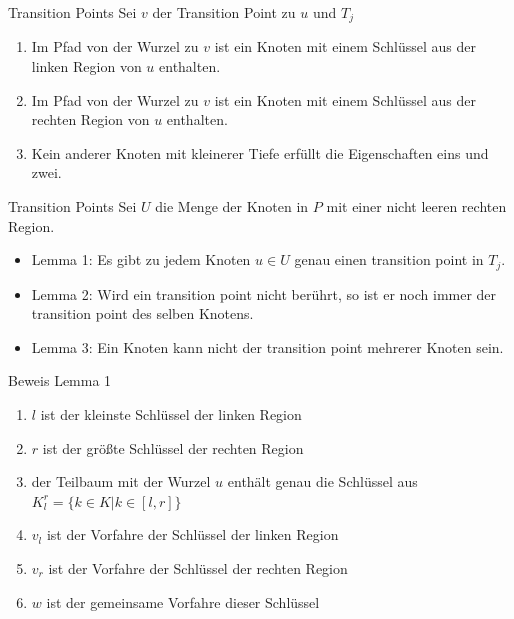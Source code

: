 \documentclass[11pt]{beamer}
\begin{document}
\begin{frame} {Transition Points} 
	Sei $v$ der Transition Point zu $u$ und $T_j$
	\begin{enumerate}
		\item Im Pfad von der Wurzel zu $v$ ist ein Knoten mit einem Schlüssel aus der linken Region von $u$ enthalten.
		\item Im Pfad von der Wurzel zu $v$ ist ein Knoten mit einem Schlüssel aus der rechten Region von $u$ enthalten.
		\item Kein anderer Knoten mit kleinerer Tiefe erfüllt die Eigenschaften eins und zwei. 
	\end{enumerate}	
\end{frame}
\begin{frame} {Transition Points} 
	Sei $U$ die Menge der Knoten in $P$ mit einer nicht leeren rechten Region.
	\begin{itemize}
		\item Lemma 1: Es gibt zu jedem Knoten $u \in U$ genau einen transition point in $T_j$. 	
		\item Lemma 2: Wird ein transition point nicht berührt, so ist er noch immer der transition point des selben Knotens.
		\item Lemma 3: Ein Knoten kann nicht der transition point mehrerer Knoten sein. 
	\end{itemize}	
\end{frame}

\begin{frame} {Beweis Lemma 1}
\begin{enumerate}
	\item  $l$	ist der kleinste Schlüssel der linken Region
	\item  $r$	ist der größte Schlüssel der rechten Region
	\pause
	\item der Teilbaum mit der Wurzel $u$ enthält genau die Schlüssel aus $K^r_l = \{k \in K \vert k \in \left[l,r\right]\}$
	\pause
	\item  $v_l$ ist der Vorfahre der Schlüssel der linken Region
	\item  $v_r$ ist der Vorfahre der Schlüssel der rechten Region
	\item  $w$ ist der gemeinsame Vorfahre dieser Schlüssel
\end{enumerate}	
\end{frame}
\end{document}
